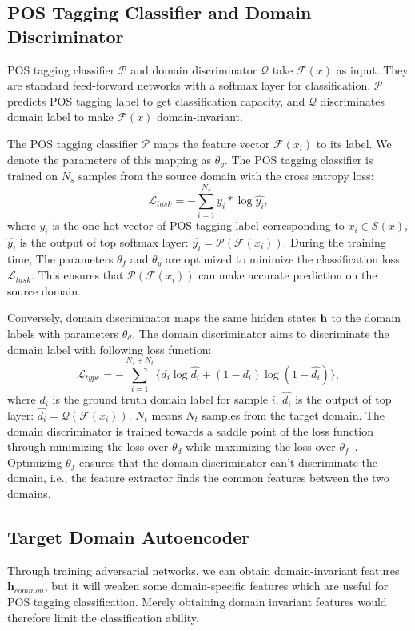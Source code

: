 \documentclass[11pt,letterpaper]{article}
\begin{document}
\subsection{POS Tagging Classifier and Domain Discriminator}
POS tagging classifier $\mathcal{P}$ and domain discriminator $\mathcal{Q}$ take $\mathcal{F}(x)$ as input. They are standard feed-forward networks with a softmax layer for classification. $\mathcal{P}$ predicts POS tagging label to get classification capacity, and $\mathcal{Q}$ discriminates domain label to make $\mathcal{F}(x)$ domain-invariant. 

The POS tagging classifier $\mathcal{P}$ maps the feature vector $\mathcal{F}(x_i)$ to its label. We denote the parameters of this mapping as $\theta_y$. The POS tagging classifier is trained on $N_s$ samples from the source domain with the cross entropy loss:
\begin{equation}
\mathcal{L}_{task}= -\sum_{i=1}^{N_s} y_i*\log\hat{y_i},
\end{equation}
where $y_i$ is the one-hot vector of POS tagging label corresponding to $x_i \in \mathcal{S}(x)$, $\hat{y_i}$ is the output of top softmax layer: $\hat{y_i} = \mathcal{P}(\mathcal{F}(x_i))$. During the training time, The parameters $\theta_f$ and $\theta_y$ are optimized to minimize the classification loss $\mathcal{L}_{task}$. This ensures that $\mathcal{P}(\mathcal{F}(x_i))$ can make accurate prediction on the source domain.

Conversely, domain discriminator maps the same hidden states $\textbf h$  to the domain labels with parameters $\theta_d$. The domain discriminator aims to discriminate the domain label with following loss function: 
\begin{equation}
\mathcal{L}_{type}=-\sum_{i=1}^{N_s+N_t}\{d_i\log\hat{d_i}+(1-d_i)\log(1-\hat{d_i})\},
\end{equation}
where $d_i$ is the ground truth domain label for sample $i$, $\hat{d_i}$ is the output of top layer: $\hat{d_i}=\mathcal{Q}(\mathcal{F}(x_i))$. $N_t$ means $N_t$ samples from the target domain. The domain discriminator is trained towards a saddle point of the loss function through minimizing the loss over $\theta_d$ while maximizing the loss over $\theta_f$~\cite{ganin2016domain}.  Optimizing $\theta_f$ ensures that the domain discriminator can't discriminate the domain, i.e., the feature extractor finds the common features between the two domains.


\subsection{Target Domain Autoencoder}
Through training adversarial networks, we can obtain domain-invariant features $\textbf{h}_{common}$, but it will weaken some domain-specific features which are useful for POS tagging classification. Merely obtaining domain invariant features would therefore limit the classification ability.
\end{document}
